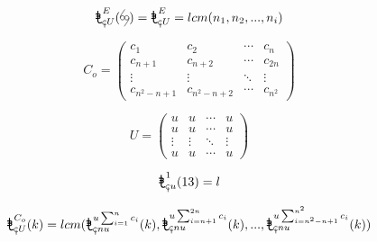 \documentclass[16pt]{article}
\newcommand{\mo}{
	\mathord{
		\tikz[scale=0.31,baseline=1.3pt]{
			\draw[thick]  (0,0.188)--(0,1.1);
			\draw[thick] (0,0.205)arc(180:318.2:0.203);
			\draw[thick] (-0.2,0.82)--(0.11,0.82);
			\draw[thick] (0.1,0.82)arc(90:-90:0.1);
			\draw[thick] (0.1,0.62)--(-0.15,0.62);
			\draw[thick] (0.1,0.62)arc(90:-90:0.1);
			\draw[thick] (0.11,0.42)--(-0.2,0.42);
		}
	}
}
\newcommand{\xm}{
	\mathord{
		\tikz[scale=0.25,baseline={(0,-0.03)}]{
			\draw (-0.3,0.3)--(-0.3,0);
			\draw (-0.3,0)--(0,0.3);
			\draw (0,0.3)--(0,0);
			\draw (0,0)--(0.3,0.3);
			\draw (0.3,0.3)--(0.3,-0.6);
			\draw (0.05,-0.2)--(0.55,-0.2);
			\fill (-0.3,0)circle(0.023);
			\fill (0,0.3)circle(0.023);
			\fill (0,0)circle(0.023);
			\fill (0.3,0.3)circle(0.023);
		}
	}
}
\newcommand{\xc}{
	\mathord{
		\tikz[scale=0.4,baseline={(0,0.06)}]{
			\draw (0.115,0.396)--(0,0.42);
			\draw (0,0.42)arc(90:325:0.15);
			\draw (0,0.26)--(0,-0.07);
			\fill (0,0.42)circle(0.017);
			
		}
	}
}
\newcommand{\he}{
	\ 
	\mathord{
		\tikz[scale=0.3, baseline={(0,-0.1)}]{
			\draw plot[smooth] coordinates{
				(0.05,0.5) (-0.2,0.07) (0.03,-0.15)
			};
			
			\draw plot[smooth] coordinates{
				(-0.05,-0.5) (0.2,-0.07) (-0.03,0.15)
			};
		}
	}
	\ 
}
\newcommand{\tanta}{
	\mathord{
		\tikz[scale=0.3, baseline={(0,-0.1)}]{
			\draw plot[smooth] coordinates{
				(-0.4,0) (-0.35,0.23) (0.03,0.8)
			};
			
			\draw plot[smooth] coordinates{
				(0.4,0) (0.35,-0.23) (-0.03,-0.8)
			};
			\draw (-0.2,0) circle [radius=0.2];
			\draw (0.2,0) circle [radius=0.2];
			
		}			
	}
}
\begin{document}
	\[ \mo^{E}_{\xc U}(\tanta) = \mo^{E}_{\xc U} = lcm(n_1, n_2, ... , n_i)\]
	
	\[
	C_o = 
	\begin{pmatrix}
		c_{1} & c_{2} & \cdots & c_{n} \\
		c_{n+1} & c_{n+2} & \cdots & c_{2n} \\
		\vdots & \vdots & \ddots & \vdots \\
		c_{n^2-n+1} & c_{n^2-n+2} & \cdots & c_{n^2}
	\end{pmatrix}
	\]
	
	\[
	U = 
	\begin{pmatrix}
		u & u & \cdots & u  \\
		u & u & \cdots & u  \\
		\vdots & \vdots & \ddots & \vdots \\
		u & u & \cdots & u
	\end{pmatrix}
	\]
	
	\[ \mo^{1}_{\xc u}(13) = l\]
	
	\[ \mo^{C_o}_{\xc U}(k) = lcm(\mo^{u\sum^{n}_{i=1}c_i}_{\xc nu}(k),\mo^{u\sum^{2n}_{i=n+1}c_i}_{\xc nu}(k),...,\mo^{u\sum^{n^2}_{i=n^2-n+1}c_i}_{\xc nu}(k))\]
	
	
	
	
	
\end{document}
